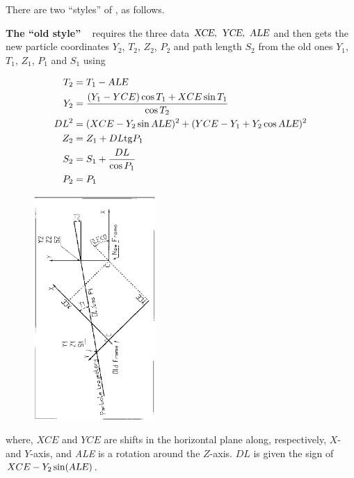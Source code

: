 {\medskip

\noindent There are two ``styles'' of \CHANGREF, as follows.

\bigskip

\noindent \textbf{ The ``old style'' \CHANGREF}~    \label{CHANGREFOld}  
requires the three data $\textsl{XCE}, ~ \textsl{YCE}, ~ \textsl{ALE}$ and then 
 gets the  new particle coordinates  $ Y_2$,  $ T_2$,  $ Z_2$, 
$ P_2 $  and path length $ S_2 $  from the old ones  $ Y_1$,   
$ T_1$,  $ Z_1$,  $ P_1 $ and $ S_1 $ using

\begin{figure}[h]
\begin{minipage}{.4\linewidth}
\begin{align*}
	T_2 &=  T_1- \text{\textsl{ALE}} \\
	Y_2 & = \dfrac{ (Y_1-YCE) \cos T_1+XCE \sin T_1}{\cos  T_2} \\
	DL^2 & =(XCE-Y_2 \sin \text{\textsl{ALE}})^2 
	         +(YCE-Y_1+Y_2 \cos \text{\textsl{ALE}})^2 \\
	Z_2  & = Z_1+DL\mathrm{tg} P_1 \\ 
	S_2 & = S_1+ \dfrac{DL }{ \cos P_1} \\
	P_2 & = P_1  
\end{align*}
\end{minipage}
\begin{minipage}{.5\linewidth}
\centerline{\includegraphics[height=8.5cm,angle=-90]{FigCHAREFa.eps}}
\end{minipage}
\end{figure}

\noindent where, $ XCE $ and $ YCE $ are shifts in the horizontal plane along, respectively, 
$ X$- and $ Y$-axis, and \textsl{ALE}  is a rotation around the $ Z$-axis. $ DL $
is given the sign of $ XCE-Y_2 \sin(\text{\textsl{ALE}})$.  


}
